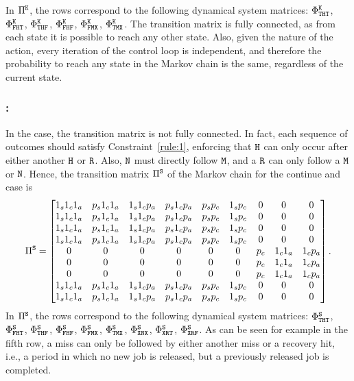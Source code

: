 In $\Pi^{\texttt{K}}$, the rows correspond to the following dynamical system matrices: $\Phi^{\texttt{K}}_{\texttt{T}\texttt{H}\texttt{T}}$, $\Phi^{\texttt{K}}_{\texttt{F}\texttt{H}\texttt{T}}$, $\Phi^{\texttt{K}}_{\texttt{T}\texttt{H}\texttt{F}}$, $\Phi^{\texttt{K}}_{\texttt{F}\texttt{H}\texttt{F}}$, $\Phi^{\texttt{K}}_{\texttt{F}\texttt{M}\texttt{X}}$, $\Phi^{\texttt{K}}_{\texttt{T}\texttt{M}\texttt{X}}$.
The transition matrix is fully connected, as from each state it is possible to reach any other state.
Also, given the nature of the \tK{} action, every iteration of the control loop is independent, and therefore the probability to reach any state in the Markov chain is the same, regardless of the current state.

\subsubsection*{\tS{}:}
In the \tS{} case, the transition matrix is not fully connected.
In fact, each sequence of outcomes should satisfy Constraint~\ref{rule:1}, enforcing that $\texttt{H}$ can only occur after either another $\texttt{H}$ or $\texttt{R}$.
Also, $\texttt{N}$ must directly follow $\texttt{M}$, and a $\texttt{R}$ can only follow a $\texttt{M}$ or $\texttt{N}$.
Hence, the transition matrix $\Pi^{\texttt{S}}$ of the Markov chain for the continue and \tS{} case is
\begin{equation}
\label{eq:piskip}
\Pi^{\Skip} = \begin{bmatrix}
            1_s1_c1_a & p_s1_c1_a & 1_s1_cp_a & p_s1_cp_a & p_sp_c & 1_sp_c & 0 & 0 & 0 \\
            1_s1_c1_a & p_s1_c1_a & 1_s1_cp_a & p_s1_cp_a & p_sp_c & 1_sp_c & 0 & 0 & 0 \\
            1_s1_c1_a & p_s1_c1_a & 1_s1_cp_a & p_s1_cp_a & p_sp_c & 1_sp_c & 0 & 0 & 0 \\
            1_s1_c1_a & p_s1_c1_a & 1_s1_cp_a & p_s1_cp_a & p_sp_c & 1_sp_c & 0 & 0 & 0 \\
            0 & 0 & 0 & 0 & 0 & 0 & p_c & 1_c1_a & 1_cp_a \\
            0 & 0 & 0 & 0 & 0 & 0 & p_c & 1_c1_a & 1_cp_a \\
            0 & 0 & 0 & 0 & 0 & 0 & p_c & 1_c1_a & 1_cp_a \\
            1_s1_c1_a & p_s1_c1_a & 1_s1_cp_a & p_s1_cp_a & p_sp_c & 1_sp_c & 0 & 0 & 0 \\
            1_s1_c1_a & p_s1_c1_a & 1_s1_cp_a & p_s1_cp_a & p_sp_c & 1_sp_c & 0 & 0 & 0 \\
\end{bmatrix}.
\end{equation}
In $\Pi^{\texttt{S}}$, the rows correspond to the following dynamical system matrices: $\Phi^{\texttt{S}}_{\texttt{T}\texttt{H}\texttt{T}}$, $\Phi^{\texttt{S}}_{\texttt{F}\texttt{H}\texttt{T}}$, $\Phi^{\texttt{S}}_{\texttt{T}\texttt{H}\texttt{F}}$, $\Phi^{\texttt{S}}_{\texttt{F}\texttt{H}\texttt{F}}$, $\Phi^{\texttt{S}}_{\texttt{F}\texttt{M}\texttt{X}}$, $\Phi^{\texttt{S}}_{\texttt{T}\texttt{M}\texttt{X}}$, $\Phi^{\texttt{S}}_{\texttt{X}\texttt{N}\texttt{X}}$, $\Phi^{\texttt{S}}_{\texttt{X}\texttt{R}\texttt{T}}$, $\Phi^{\texttt{S}}_{\texttt{X}\texttt{R}\texttt{F}}$.
As can be seen for example in the fifth row, a miss can only be followed by either another miss or a recovery hit, i.e., a period in which no new job is released, but a previously released job is completed.
 
